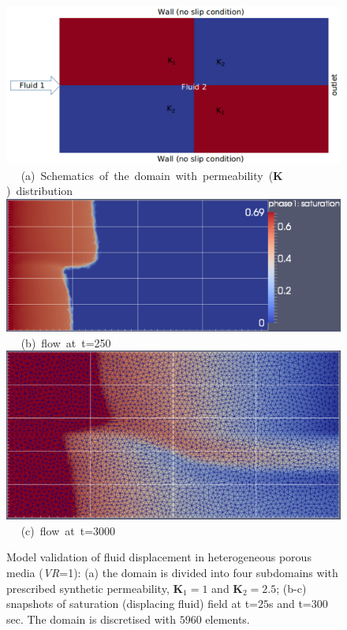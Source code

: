 \begin{figure}[ht] 
\vbox{
\hbox{\hspace{-0.3cm}
\includegraphics[width=.8\textwidth]{./Pics1/2b2_wi_fine/2b2_whole_in_fine_perm_1.pdf} 
}
\vspace{0.0cm}
\hbox{\hspace{3.5cm} (a) Schematics of the domain with permeability ($\mathbf{K}$) distribution
}
\vspace{0.25cm}
\hbox{\hspace{1.5cm}
\includegraphics[width=.85\textwidth]{./Pics1/2b2_wi_fine/2b2_whole_in_fine_250_2.pdf}
}
\vspace{0.0cm}
\hbox{\hspace{4.5cm} (b) flow at t=250 
}
\vspace{0.25cm}
\hbox{\hspace{1.5cm}
\includegraphics[width=.65\textwidth]{./Pics1/2b2_wi_fine/2b2_whole_in_fine_3000_2.pdf}
}
\vspace{0.0cm}
\hbox{\hspace{4.0cm} (c) flow at t=3000   
}}     
\caption{Model validation of fluid displacement in heterogeneous porous media ({\it VR}=1): (a) the domain is divided into four subdomains with prescribed synthetic permeability, $\mathbf{K}_{1}=1$ and $\mathbf{K}_{2}=2.5$; (b-c) snapshots of saturation (displacing fluid) field at t=$25$s and t=$300$ sec. The domain is discretised with $5960$  elements. }
\label{fem_cv_represent_a}
\end{figure}
\clearpage




